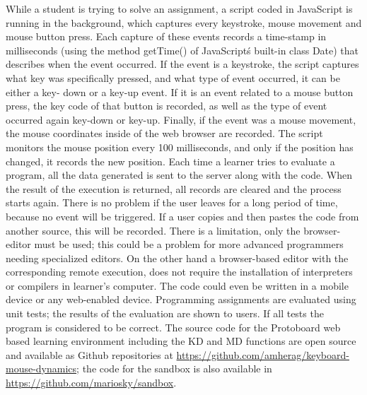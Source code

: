 \documentclass[a4paper,twoside]{article}
\begin{document}
While a student is trying
to solve an assignment, a script coded in JavaScript is running in the background,
which captures every keystroke, mouse movement and mouse button press. Each
capture of these events records a time-stamp in milliseconds (using the method
getTime() of JavaScript\'s built-in class Date) that describes when the event
occurred. If the event is a keystroke, the script captures what key was
specifically pressed, and what type of event occurred, it can be either a key-
down or a key-up event. If it is an event related to a mouse button press, the
key code of that button is recorded, as well as the type of event occurred again
key-down or key-up. Finally, if the event was a mouse movement, the mouse
coordinates inside of the web browser are recorded. The script monitors the
mouse position every 100 milliseconds, and only if the position has changed, it
records the new position. Each time a learner tries to evaluate a program, all
the data generated is sent to the server along with the code. When the result of
the execution is returned, all records are cleared and the process starts again.
There is no problem if the user leaves for a long period of time, because no
event will be triggered. If a user copies and then pastes the code from another
source, this will be recorded. There is a limitation, only the browser-editor
must be used; this could be a problem for more advanced programmers needing
specialized editors.  On the other hand a browser-based editor with the
corresponding remote execution, does not require the installation of
interpreters or compilers in learner’s computer. The code could even be written
in a mobile device or any web-enabled device. Programming assignments are evaluated using unit
tests; the results of the evaluation are shown to users. If all tests the
program is considered to be correct. The source code for the Protoboard web
based learning environment including the KD and MD functions are open source and
available as Github repositories at \url{https://github.com/amherag/keyboard-mouse-dynamics}; the code for the
sandbox is also available in \url{https://github.com/mariosky/sandbox}.

\end{document}
